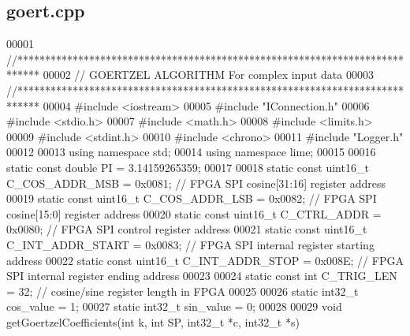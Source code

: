\subsection{goert.\+cpp}
\label{goert_8cpp_source}

\begin{DoxyCode}
00001 \textcolor{comment}{//****************************************************************************}
00002 \textcolor{comment}{//   GOERTZEL ALGORITHM       For complex input data}
00003 \textcolor{comment}{//****************************************************************************}
00004 \textcolor{preprocessor}{#include <iostream>}
00005 \textcolor{preprocessor}{#include "IConnection.h"}
00006 \textcolor{preprocessor}{#include <stdio.h>}
00007 \textcolor{preprocessor}{#include <math.h>}
00008 \textcolor{preprocessor}{#include <limits.h>}
00009 \textcolor{preprocessor}{#include <stdint.h>}
00010 \textcolor{preprocessor}{#include <chrono>}
00011 \textcolor{preprocessor}{#include "Logger.h"}
00012 
00013 \textcolor{keyword}{using namespace }std;
00014 \textcolor{keyword}{using namespace }lime;
00015 
00016 \textcolor{keyword}{static} \textcolor{keyword}{const} \textcolor{keywordtype}{double} PI = 3.14159265359;
00017 
00018 \textcolor{keyword}{static} \textcolor{keyword}{const} uint16\_t C_COS_ADDR_MSB   = 0x0081;   \textcolor{comment}{// FPGA SPI cosine[31:16] register address}
00019 \textcolor{keyword}{static} \textcolor{keyword}{const} uint16\_t C_COS_ADDR_LSB   = 0x0082;   \textcolor{comment}{// FPGA SPI cosine[15:0] register address}
00020 \textcolor{keyword}{static} \textcolor{keyword}{const} uint16\_t C_CTRL_ADDR      = 0x0080;   \textcolor{comment}{// FPGA SPI control register address}
00021 \textcolor{keyword}{static} \textcolor{keyword}{const} uint16\_t C_INT_ADDR_START = 0x0083;   \textcolor{comment}{// FPGA SPI internal register starting address}
00022 \textcolor{keyword}{static} \textcolor{keyword}{const} uint16\_t C_INT_ADDR_STOP  = 0x008E;   \textcolor{comment}{// FPGA SPI internal register ending address}
00023 
00024 \textcolor{keyword}{static} \textcolor{keyword}{const} \textcolor{keywordtype}{int} C_TRIG_LEN = 32;   \textcolor{comment}{// cosine/sine register length in FPGA}
00025 
00026 \textcolor{keyword}{static} int32\_t cos_value = 1;
00027 \textcolor{keyword}{static} int32\_t sin_value = 0;
00028 
00029 \textcolor{keywordtype}{void} getGoertzelCoefficients(\textcolor{keywordtype}{int} k, \textcolor{keywordtype}{int} SP, int32\_t *c, int32\_t *s)

\end{DoxyCode}
